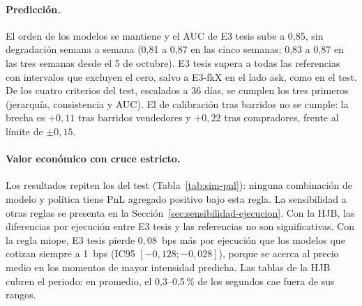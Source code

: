 \paragraph{Predicción.} El orden de los modelos se mantiene y el AUC de E3 tesis sube a 0,85, sin degradación semana a semana (0,81 a 0,87 en las cinco semanas; 0,83 a 0,87 en las tres semanas desde el 5 de octubre). E3 tesis supera a todas las referencias con intervalos que excluyen el cero, salvo a E3-fkX en el lado ask, como en el test. De los cuatro criterios del test, escalados a 36 días, se cumplen los tres primeros (jerarquía, consistencia y AUC). El de calibración tras barridos no se cumple: la brecha es $+0{,}11$ tras barridos vendedores y $+0{,}22$ tras compradores, frente al límite de $\pm0{,}15$.

\paragraph{Valor económico con cruce estricto.} Los resultados repiten los del test (Tabla~\ref{tab:sim-pnl}): ninguna combinación de modelo y política tiene PnL agregado positivo bajo esta regla. La sensibilidad a otras reglas se presenta en la Sección~\ref{sec:sensibilidad-ejecucion}. Con la HJB, las diferencias por ejecución entre E3 tesis y las referencias no son significativas. Con la regla miope, E3 tesis pierde $0{,}08$~bps más por ejecución que los modelos que cotizan siempre a 1~bps (IC95 $[-0{,}128; -0{,}028]$), porque se acerca al precio medio en los momentos de mayor intensidad predicha. Las tablas de la HJB cubren el periodo: en promedio, el 0,3--0,5\,\% de los segundos cae fuera de sus rangos.

